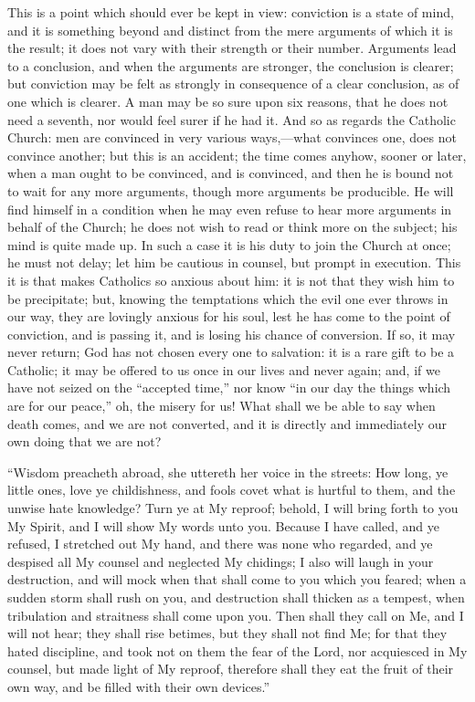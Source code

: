 This is a point which should ever be kept in view: conviction is a
state of mind, and it is something beyond and distinct from the mere
arguments of which it is the result; it does not vary with their
strength or their number. Arguments lead to a conclusion, and when the
arguments are stronger, the conclusion is clearer; but conviction may
be felt as strongly in consequence of a clear conclusion, as of one
which is clearer. A man may be so sure upon six reasons, that he does
not need a seventh, nor would feel surer if he had it. And so as
regards the Catholic Church: men are convinced in very various ways,—what
convinces one, does not convince another; but this is an accident; the
time comes anyhow, sooner or later, when a man ought to be convinced,
and is convinced, and then he is bound not to wait for any more
arguments, though more arguments be producible. He will find himself
in a condition when he may even refuse to hear more arguments in
behalf of the Church; he does not wish to read or think more on the
subject; his mind is quite made up. In such a case it is his duty to
join the Church at once; he must not delay; let him be cautious in
counsel, but prompt in execution. This it is that makes Catholics so
anxious about him: it is not that they wish him to be precipitate;
but, knowing the temptations which the evil one ever throws in our
way, they are lovingly anxious for his soul, lest he has come to the
point of conviction, and is passing it, and is losing his chance of
conversion. If so, it may never return; God has not chosen every one
to salvation: it is a rare gift to be a Catholic; it may be offered to
us once in our lives and never again; and, if we have not seized on
the ``accepted time,'' nor know ``in our day the things
which are for our peace,'' oh, the misery for us! What shall we be
able to say when death comes, and we are not converted, and it is
directly and immediately our own doing that we are not?

``Wisdom preacheth abroad, she uttereth her voice in the
streets: How long, ye little ones, love ye childishness, and fools
covet what is hurtful to them, and the unwise hate knowledge? Turn ye
at My reproof; behold, I will bring forth to you My Spirit, and I will
show My words unto you. Because I have called, and ye refused, I
stretched out My hand, and there was none who regarded, and ye
despised all My counsel and neglected My chidings; I also will laugh
in your destruction, and will mock when that shall come to you which
you feared; when a sudden storm shall rush on you, and destruction
shall thicken as a tempest, when tribulation and straitness shall come
upon you. Then shall they call on Me, and I will not hear; they shall
rise betimes, but they shall not find Me; for that they hated
discipline, and took not on them the fear of the Lord, nor acquiesced
in My counsel, but made light of My reproof, therefore shall they eat
the fruit of their own way, and be filled with their own
devices.''

